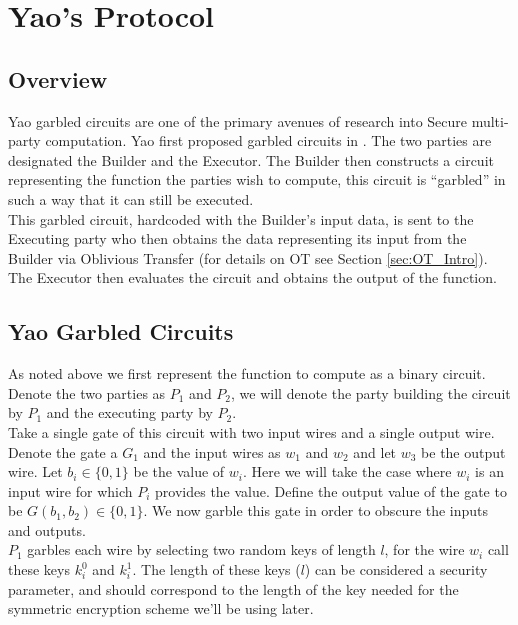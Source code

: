 \documentclass[ %
                    author={Nicholas Tutte},
                supervisor={Prof. Nigel Smart},
                    degree={MEng},
                     title={Secure Two Party Computation},
                  subtitle={A practical comparison of recent protocols},
                      type={Research - GG1K},
                      year={2015} ]{dissertation}
\begin{document}
	\section{Yao's Protocol} \label{sec:Yao_Circuits}

		\subsection{Overview} \label{sub:Yao_Overview}
			Yao garbled circuits are one of the primary avenues of research into Secure multi-party computation. Yao first proposed garbled circuits in \cite{YaoOriginal}. The two parties are designated the Builder and the Executor. The Builder then constructs a circuit representing the function the parties wish to compute, this circuit is ``garbled'' in such a way that it can still be executed.\\

			This garbled circuit, hardcoded with the Builder's input data, is sent to the Executing party who then obtains the data representing its input from the Builder via Oblivious Transfer (for details on OT see Section  \ref{sec:OT_Intro}). The Executor then evaluates the circuit and obtains the output of the function.


		\subsection{Yao Garbled Circuits} \label{sub:Yao_Details}
			As noted above we first represent the function to compute as a binary circuit. Denote the two parties as $P_1$ and $P_2$, we will denote the party building the circuit by $P_1$ and the executing party by $P_2$.\\
			
			Take a single gate of this circuit with two input wires and a single output wire. Denote the gate a $G_1$ and the input wires as $w_1$ and $w_2$ and let $w_3$ be the output wire. Let $b_i \in \{0, 1\}$ be the value of $w_i$. Here we will take the case where $w_i$ is an input wire for which $P_i$ provides the value. Define the output value of the gate to be $G(b_1, b_2) \in \{0, 1\}$. We now garble this gate in order to obscure the inputs and outputs.\\

			$P_1$ garbles each wire by selecting two random keys of length $l$, for the wire $w_i$ call these keys $k_i^0$ and $k_i^1$. The length of these keys ($l$) can be considered a security parameter, and should correspond to the length of the key needed for the symmetric encryption scheme we'll be using later.\\
\end{document}
